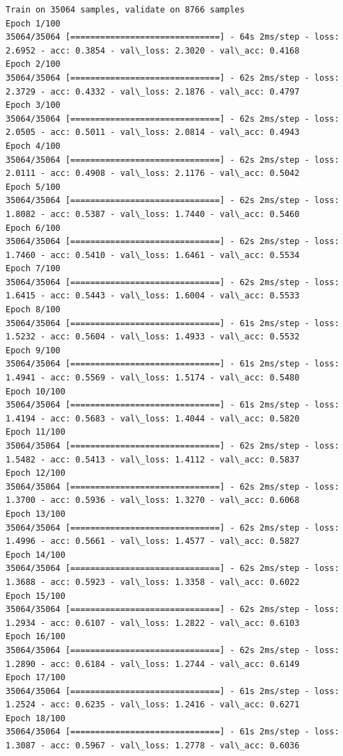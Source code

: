 \documentclass[11pt]{article}
\begin{document}
    \begin{Verbatim}[commandchars=\\\{\}]
Train on 35064 samples, validate on 8766 samples
Epoch 1/100
35064/35064 [==============================] - 64s 2ms/step - loss: 2.6952 - acc: 0.3854 - val\_loss: 2.3020 - val\_acc: 0.4168
Epoch 2/100
35064/35064 [==============================] - 62s 2ms/step - loss: 2.3729 - acc: 0.4332 - val\_loss: 2.1876 - val\_acc: 0.4797
Epoch 3/100
35064/35064 [==============================] - 62s 2ms/step - loss: 2.0505 - acc: 0.5011 - val\_loss: 2.0814 - val\_acc: 0.4943
Epoch 4/100
35064/35064 [==============================] - 62s 2ms/step - loss: 2.0111 - acc: 0.4908 - val\_loss: 2.1176 - val\_acc: 0.5042
Epoch 5/100
35064/35064 [==============================] - 62s 2ms/step - loss: 1.8082 - acc: 0.5387 - val\_loss: 1.7440 - val\_acc: 0.5460
Epoch 6/100
35064/35064 [==============================] - 62s 2ms/step - loss: 1.7460 - acc: 0.5410 - val\_loss: 1.6461 - val\_acc: 0.5534
Epoch 7/100
35064/35064 [==============================] - 62s 2ms/step - loss: 1.6415 - acc: 0.5443 - val\_loss: 1.6004 - val\_acc: 0.5533
Epoch 8/100
35064/35064 [==============================] - 61s 2ms/step - loss: 1.5232 - acc: 0.5604 - val\_loss: 1.4933 - val\_acc: 0.5532
Epoch 9/100
35064/35064 [==============================] - 61s 2ms/step - loss: 1.4941 - acc: 0.5569 - val\_loss: 1.5174 - val\_acc: 0.5480
Epoch 10/100
35064/35064 [==============================] - 61s 2ms/step - loss: 1.4194 - acc: 0.5683 - val\_loss: 1.4044 - val\_acc: 0.5820
Epoch 11/100
35064/35064 [==============================] - 62s 2ms/step - loss: 1.5482 - acc: 0.5413 - val\_loss: 1.4112 - val\_acc: 0.5837
Epoch 12/100
35064/35064 [==============================] - 62s 2ms/step - loss: 1.3700 - acc: 0.5936 - val\_loss: 1.3270 - val\_acc: 0.6068
Epoch 13/100
35064/35064 [==============================] - 62s 2ms/step - loss: 1.4996 - acc: 0.5661 - val\_loss: 1.4577 - val\_acc: 0.5827
Epoch 14/100
35064/35064 [==============================] - 62s 2ms/step - loss: 1.3688 - acc: 0.5923 - val\_loss: 1.3358 - val\_acc: 0.6022
Epoch 15/100
35064/35064 [==============================] - 62s 2ms/step - loss: 1.2934 - acc: 0.6107 - val\_loss: 1.2822 - val\_acc: 0.6103
Epoch 16/100
35064/35064 [==============================] - 62s 2ms/step - loss: 1.2890 - acc: 0.6184 - val\_loss: 1.2744 - val\_acc: 0.6149
Epoch 17/100
35064/35064 [==============================] - 61s 2ms/step - loss: 1.2524 - acc: 0.6235 - val\_loss: 1.2416 - val\_acc: 0.6271
Epoch 18/100
35064/35064 [==============================] - 61s 2ms/step - loss: 1.3087 - acc: 0.5967 - val\_loss: 1.2778 - val\_acc: 0.6036

\end{Verbatim}
\end{document}
